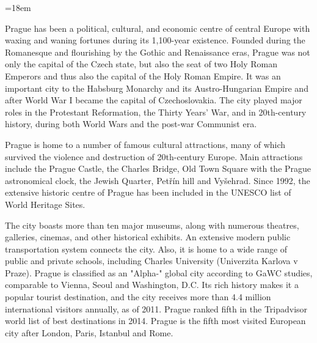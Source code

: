 \documentclass{article}
\begin{document}
\hsize=18em

Prague has been a political, cultural, and economic centre of central Europe
with waxing and waning fortunes during its 1,100-year existence. Founded during
the Romanesque and flourishing by the Gothic and Renaissance eras, Prague was
not only the capital of the Czech state, but also the seat of two Holy Roman
Emperors and thus also the capital of the Holy Roman Empire. It was an
important city to the Habsburg Monarchy and its Austro-Hungarian Empire and
after World War I became the capital of Czechoslovakia. The city played major
roles in the Protestant Reformation, the Thirty Years' War, and in 20th-century
history, during both World Wars and the post-war Communist era.

Prague is home to a number of famous cultural attractions, many of which
survived the violence and destruction of 20th-century Europe. Main attractions
include the Prague Castle, the Charles Bridge, Old Town Square with the Prague
astronomical clock, the Jewish Quarter, Petřín hill and Vyšehrad. Since 1992,
the extensive historic centre of Prague has been included in the UNESCO list of
World Heritage Sites.

The city boasts more than ten major museums, along with numerous theatres,
galleries, cinemas, and other historical exhibits. An extensive modern public
transportation system connects the city. Also, it is home to a wide range of
public and private schools, including Charles University (Univerzita Karlova v
Praze). Prague is classified as an "Alpha-" global city according to GaWC
studies, comparable to Vienna, Seoul and Washington, D.C. Its rich history
makes it a popular tourist destination, and the city receives more than 4.4
million international visitors annually, as of 2011. Prague ranked fifth in
the Tripadvisor world list of best destinations in 2014. Prague is the
fifth most visited European city after London, Paris, Istanbul and Rome.
\end{document}
